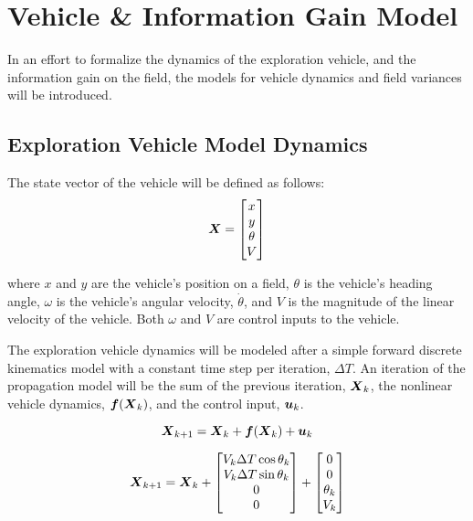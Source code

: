\chapter{Vehicle \& Information Gain Model}
In an effort to formalize the dynamics of the exploration vehicle, and the information gain on the field, the models for vehicle dynamics and field variances will be introduced.

\section{Exploration Vehicle Model Dynamics} \label{sec:vehicledynamics}
The state vector of the vehicle will be defined as follows:
\begin{equation}
{\it{\boldsymbol{X}}} = \begin{bmatrix}
	x \\
	y \\
	\theta \\
	V
\end{bmatrix}
\label{eq:vehiclemodel}
\end{equation}

\noindent where $x$ and $y$ are the vehicle's position on a field, $\theta$ is the vehicle's heading angle, $\omega$ is the vehicle's angular velocity, $\dot{\theta}$, and $V$ is the magnitude of the linear velocity of the vehicle. Both $\omega$ and $V$ are control inputs to the vehicle.

The exploration vehicle dynamics will be modeled after a simple forward discrete kinematics model with a constant time step per iteration, $\Delta T$. An iteration of the propagation model will be the sum of the previous iteration, ${\it{\boldsymbol{X}}}_{k}$, the nonlinear vehicle dynamics, ${\it{\boldsymbol{f}}}({\it{\boldsymbol{X}}}_k)$, and the control input, ${\it{\boldsymbol{u}}}_k$.

\begin{equation}
	{\it{\boldsymbol{X}}}_{k+1} = {\it{\boldsymbol{X}}}_k + {\it{\boldsymbol{f}}}({\it{\boldsymbol{X}}}_{k}) + {\it{\boldsymbol{u}}}_k
	\label{eq:vehicledynamicsform}
\end{equation}

\begin{equation}
	{\it{\boldsymbol{X}}}_{k+1} = {\it{\boldsymbol{X}}}_k + \begin{bmatrix}
		V_k \Delta T \cos \theta_k \\
		V_k \Delta T \sin \theta_k \\
		0 \\
		0
	\end{bmatrix} + \begin{bmatrix}
	0 \\
	0 \\
	\theta_k \\
	V_k
	\end{bmatrix}
	\label{eq:vehicledynamicsmodel}
\end{equation}

